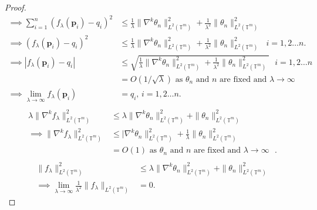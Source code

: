 \documentclass[multixcb]{amstext-l}
\theoremstyle{plain}
\theoremstyle{definition}
\theoremstyle{definition}
\theoremstyle{remark}
\numberwithin{equation}{chapter}
\begin{document}
\begin{proof}
\begin{equation}
\begin{aligned}
\implies \sum\limits_{i=1}^{n}(f_{\lambda}(\boldsymbol{p}_i)-q_i)^2 &\le \frac{1}{\lambda}\|\nabla^k \theta_n\|_{L^2(\mathbb{T}^m)}^2 + \frac{1}{\lambda^2}\|\theta_n\|_{L^2(\mathbb{T}^m)}^2\\
\implies (f_{\lambda}(\boldsymbol{p}_i)-q_i)^2 &\le \frac{1}{\lambda}\|\nabla^k \theta_n\|_{L^2(\mathbb{T}^m)}^2 + \frac{1}{\lambda^2}\|\theta_n\|_{L^2(\mathbb{T}^m)}^2 \mbox{         }i = 1,2\ldots n . \\
\implies \left|f_{\lambda}(\boldsymbol{p}_i)-q_i\right| &\le \sqrt{\frac{1}{\lambda}\|\nabla^k \theta_n\|_{L^2(\mathbb{T}^m)}^2 + \frac{1}{\lambda^2}\|\theta_n\|_{L^2(\mathbb{T}^m)}^2} \mbox{        }i = 1,2\ldots n  \\
&= O(1/\sqrt{\lambda}) \mbox{      as $\theta_n$ and $n$ are fixed and $\lambda\to\infty$}\\
\implies \lim\limits_{\lambda\to\infty}f_{\lambda}(\boldsymbol{p}_i) &= q_i \mbox{,               }i = 1,2\ldots n  .\\
\end{aligned}
\end{equation}
\begin{equation}\label{eq44}\begin{aligned}
    \lambda\|\nabla^k f_{\lambda}\|^2_{L^2(\mathbb{T}^m)} &\le \lambda\|\nabla^k \theta_n\|_{L^2(\mathbb{T}^m)}^2 + \|\theta_n\|_{L^2(\mathbb{T}^m)}^2\\
    \implies \|\nabla^k f_{\lambda}\|^2_{L^2(\mathbb{T}^m)} &\le |\nabla^k \theta_n\|_{L^2(\mathbb{T}^m)}^2 + \frac{1}{\lambda}\|\theta_n\|_{L^2(\mathbb{T}^m)}^2\\
    &= O(1)  \mbox{               as $\theta_n$ and $n$ are fixed and $\lambda\to\infty$ }.\\
    \end{aligned}
\end{equation}
\begin{equation}\label{eq45}\begin{aligned}
\| f_{\lambda}\|^2_{L^2(\mathbb{T}^m)} &\le \lambda\|\nabla^k \theta_n\|_{L^2(\mathbb{T}^m)}^2 + \|\theta_n\|_{L^2(\mathbb{T}^m)}^2\\
    \implies \lim\limits_{\lambda\to\infty}\frac{1}{\lambda^2}\|f_{\lambda}\|_{L^2(\mathbb{T}^m)} &= 0.
    \end{aligned}
\end{equation}



\end{proof}
\end{document}
